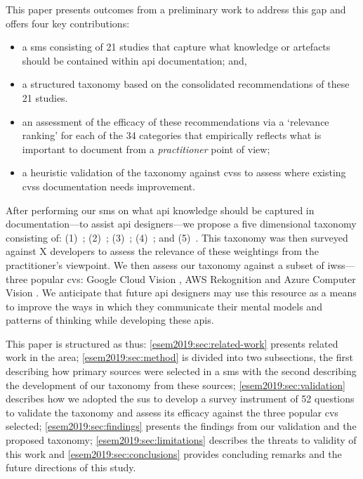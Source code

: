 This paper presents outcomes from a preliminary work to address this gap and offers four key contributions:
\begin{itemize}
  \item a \gls{sms} consisting of 21 studies that capture what knowledge or artefacts should be contained within \gls{api} documentation; and,
  \item a structured taxonomy based on the consolidated recommendations of these 21 studies.
  \item {} an assessment of the efficacy of these recommendations via a `relevance ranking' for each of the 34 categories that empirically reflects what is important to document from a \textit{practitioner} point of view;
  \item {} a heuristic validation of the taxonomy against \glspl{cvs} to assess where existing \glspl{cvs} documentation needs improvement.
\end{itemize}

After performing our \gls{sms} on what \gls{api} knowledge should be captured in documentation---to assist \gls{api} designers---we propose a five dimensional taxonomy consisting of: (1)~\dima{}; (2)~\dimb{}; (3)~\dimc{}; (4)~\dimd{}; and (5)~\dime{}.  This taxonomy was then surveyed against X developers to assess the relevance of these weightings from the practitioner's viewpoint.  We then assess our taxonomy against a subset of \glspl{iws}---three popular \gls{cvs}: Google Cloud Vision , AWS Rekognition  and Azure Computer Vision . We anticipate that future \gls{api} designers may use this resource as a means to improve the ways in which they communicate their mental models and patterns of thinking while developing these \glspl{api}.

This paper is structured as thus: \cref{esem2019:sec:related-work} presents related work in the area; \cref{esem2019:sec:method} is divided into two subsections, the first describing how primary sources were selected in a \gls{sms} with the second describing the development of our taxonomy from these sources;  \cref{esem2019:sec:validation} describes how we adopted the \gls{sus} to develop a survey instrument of 52 questions to validate the taxonomy and assess its efficacy against the three popular \gls{cvs} selected; \cref{esem2019:sec:findings} presents the findings from our validation and the proposed taxonomy; \cref{esem2019:sec:limitations} describes the threats to validity of this work and \cref{esem2019:sec:conclusions} provides concluding remarks and the future directions of this study.

